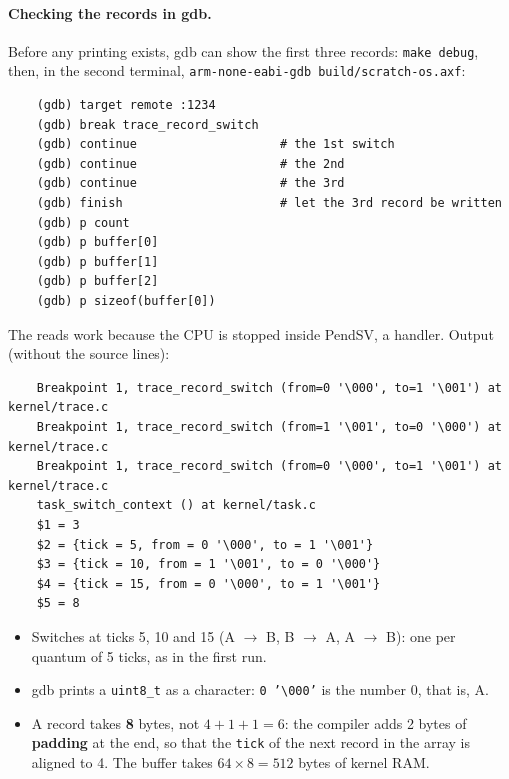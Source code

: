 \paragraph{Checking the records in gdb.} Before any printing exists, gdb can show the first three records: \texttt{make debug}, then, in the second terminal, \texttt{arm-none-eabi-gdb build/scratch-os.axf}:
\begin{lstlisting}
    (gdb) target remote :1234
    (gdb) break trace_record_switch
    (gdb) continue                    # the 1st switch
    (gdb) continue                    # the 2nd
    (gdb) continue                    # the 3rd
    (gdb) finish                      # let the 3rd record be written
    (gdb) p count
    (gdb) p buffer[0]
    (gdb) p buffer[1]
    (gdb) p buffer[2]
    (gdb) p sizeof(buffer[0])
\end{lstlisting}
The reads work because the CPU is stopped inside PendSV, a handler. Output (without the source lines):
\begin{lstlisting}
    Breakpoint 1, trace_record_switch (from=0 '\000', to=1 '\001') at kernel/trace.c
    Breakpoint 1, trace_record_switch (from=1 '\001', to=0 '\000') at kernel/trace.c
    Breakpoint 1, trace_record_switch (from=0 '\000', to=1 '\001') at kernel/trace.c
    task_switch_context () at kernel/task.c
    $1 = 3
    $2 = {tick = 5, from = 0 '\000', to = 1 '\001'}
    $3 = {tick = 10, from = 1 '\001', to = 0 '\000'}
    $4 = {tick = 15, from = 0 '\000', to = 1 '\001'}
    $5 = 8
\end{lstlisting}
\begin{itemize}
    \item Switches at ticks 5, 10 and 15 (A $\to$ B, B $\to$ A, A $\to$ B): one per quantum of 5 ticks, as in the first run.
    \item gdb prints a \texttt{uint8\_t} as a character: \texttt{0 '\textbackslash 000'} is the number 0, that is, A.
    \item A record takes \textbf{8} bytes, not $4 + 1 + 1 = 6$: the compiler adds 2 bytes of \textbf{padding} at the end, so that the \texttt{tick} of the next record in the array is aligned to 4. The buffer takes $64 \times 8 = 512$ bytes of kernel RAM.
\end{itemize}


